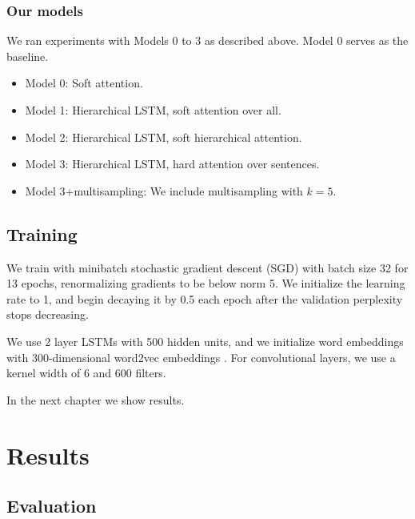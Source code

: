 \documentclass[11pt]{report}
\begin{document}


\subsection{Our models}

We ran experiments with Models 0 to 3 as described above. Model 0 serves as the baseline.

\begin{itemize}
\item Model 0: Soft attention.
\item Model 1: Hierarchical LSTM, soft attention over all.
\item Model 2: Hierarchical LSTM, soft hierarchical attention.
\item Model 3: Hierarchical LSTM, hard attention over sentences.
\item Model 3+multisampling: We include multisampling with $k=5$.
\end{itemize}



\section{Training}

We train with minibatch stochastic gradient descent (SGD) with batch size 32 for 13 epochs, renormalizing gradients to be below norm 5. We initialize the learning rate to 1, and begin decaying it by 0.5 each epoch after the validation perplexity stops decreasing. 

We use 2 layer LSTMs with 500 hidden units, and we initialize word embeddings with 300-dimensional word2vec embeddings \citep{mikolov2013word2vec}. For convolutional layers, we use a kernel width of 6 and 600 filters.


In the next chapter we show results.

\chapter{Results}

\section{Evaluation} %
\end{document}
